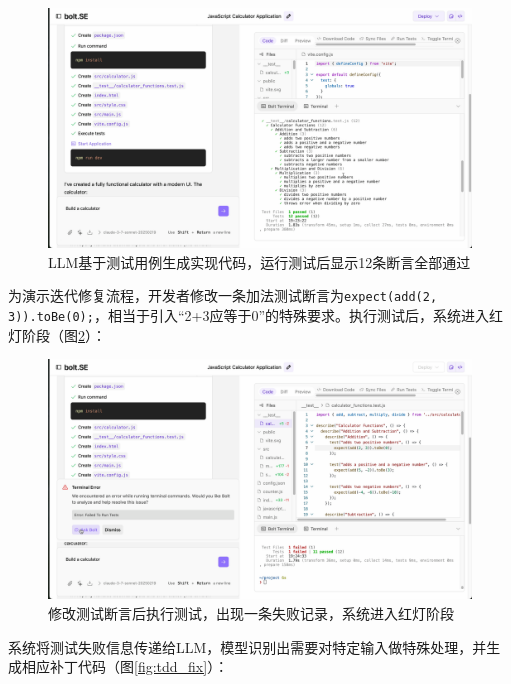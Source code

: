 \begin{figure}
  \centering
  \includegraphics[width=.9\textwidth]{figures/screenshots/tdd/green_pass_initial.png}
  \caption{LLM基于测试用例生成实现代码，运行测试后显示12条断言全部通过}
  \label{fig:tdd_green_initial}
\end{figure}

为演示迭代修复流程，开发者修改一条加法测试断言为\verb|expect(add(2, 3)).toBe(0);|，相当于引入“2+3应等于0”的特殊要求。执行测试后，系统进入红灯阶段（图\ref{fig:tdd_red}）：

\begin{figure}
  \centering
  \includegraphics[width=.9\textwidth]{figures/screenshots/tdd/test_edit_fail.png}
  \caption{修改测试断言后执行测试，出现一条失败记录，系统进入红灯阶段}
  \label{fig:tdd_red}
\end{figure}

系统将测试失败信息传递给LLM，模型识别出需要对特定输入做特殊处理，并生成相应补丁代码（图\ref{fig:tdd_fix}）：

